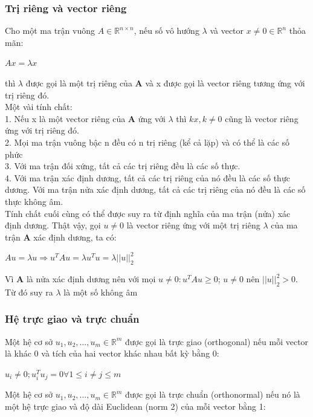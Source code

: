 \subsubsection{Trị riêng và vector riêng} 
Cho một ma trận vuông $A\in \mathbb{R}^{n\times n}$, nếu số vô hướng $\lambda$ và vector $x \neq 0 \in \mathbb{R}^n$ thỏa mãn:\\
\begin{center}
	$Ax=\lambda x$    
\end{center}
thì $\lambda$ được gọi là một trị riêng của \textbf{A} và x được gọi là vector riêng tương ứng với trị riêng đó. \\
Một vài tính chất: \\
1. Nếu x là một vector riêng của \textbf{A} ứng với $\lambda$ thì $kx, k\neq 0$ cũng là vector riêng ứng với trị riêng đó.\\
2. Mọi ma trận vuông bậc n đều có n trị riêng (kể cả lặp) và có thể là các số phức\\
3. Với ma trận đối xứng, tất cả các trị riêng đều là các số thực.\\
4. Với ma trận xác định dương, tất cả các trị riêng của nó đều là các số thực dương. Với ma trận nửa xác định dương, tất cả các trị riêng của nó đều là các số thực không âm.\\
Tính chất cuối cùng có thể được suy ra từ định nghĩa của ma trận (nửa) xác định dương. Thật vậy, gọi $u \neq 0$ là vector riêng ứng với một trị riêng $\lambda$ của ma trận \textbf{A} xác định dương, ta có:
\begin{center}
	$Au=\lambda u \Rightarrow u^{T}Au=\lambda u^{T}u=\lambda ||u||_2^2$
\end{center}
Vì \textbf{A} là nửa xác định dương nên với mọi $u \neq 0: u^{T}Au \geq 0$; $u \neq 0$ nên $||u||_2^2 > 0$. Từ đó suy ra $\lambda $ là một số không âm\\

\subsubsection{Hệ trực giao và trực chuẩn}
Một hệ cơ sở $u_1, u_2, ...,u_m \in \mathbb{R}^m$ được gọi là trực giao (orthogonal) nếu mỗi vector là khác 0 và tích của hai vector khác nhau bất kỳ bằng 0:\\
\begin{center}
	$u_i \neq 0; u_i^{T}u_j=0  \forall  1\leq i \neq j\leq m	$
\end{center}
Một hệ cơ sở $u_1, u_2, ...,u_m \in \mathbb{R}^m$ được gọi là trực chuẩn (orthonormal) nếu nó là một hệ trực giao và độ dài Euclidean (norm 2) của mỗi vector bằng 1:\\


